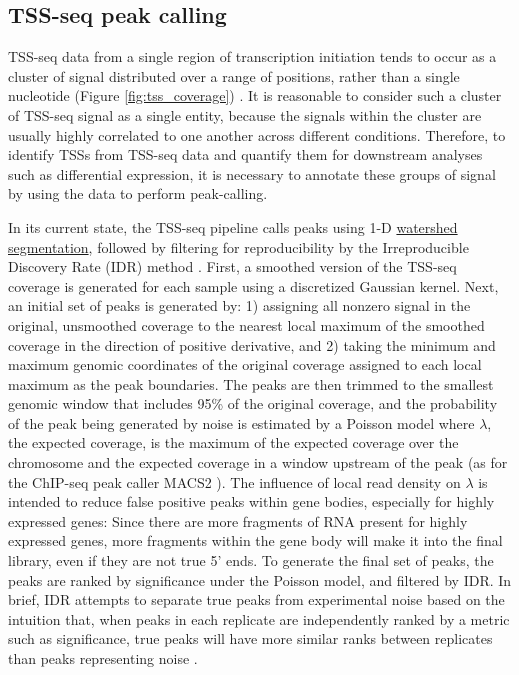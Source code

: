 \subsection{TSS-seq peak calling}

TSS-seq data from a single region of transcription initiation tends to occur as a cluster of signal distributed over a range of positions, rather than a single nucleotide (Figure \ref{fig:tss_coverage}) \citep{arribere2013, malabat2015}.
It is reasonable to consider such a cluster of TSS-seq signal as a single entity, because the signals within the cluster are usually highly correlated to one another across different conditions.
Therefore, to identify TSSs from TSS-seq data and quantify them for downstream analyses such as differential expression, it is necessary to annotate these groups of signal by using the data to perform peak-calling.

In its current state, the TSS-seq pipeline calls peaks using 1-D \href{https://en.wikipedia.org/wiki/Watershed_(image_processing)}{watershed segmentation}, followed by filtering for reproducibility by the Irreproducible Discovery Rate (IDR) method \citep{li2011}.
First, a smoothed version of the TSS-seq coverage is generated for each sample using a discretized Gaussian kernel.
Next, an initial set of peaks is generated by: 1) assigning all nonzero signal in the original, unsmoothed coverage to the nearest local maximum of the smoothed coverage in the direction of positive derivative, and 2) taking the minimum and maximum genomic coordinates of the original coverage assigned to each local maximum as the peak boundaries.
The peaks are then trimmed to the smallest genomic window that includes 95\% of the original coverage, and the probability of the peak being generated by noise is estimated by a Poisson model where $\lambda$, the expected coverage, is the maximum of the expected coverage over the chromosome and the expected coverage in a window upstream of the peak (as for the ChIP-seq peak caller MACS2 \citep{zhang2008}).
The influence of local read density on $\lambda$ is intended to reduce false positive peaks within gene bodies, especially for highly expressed genes: Since there are more fragments of RNA present for highly expressed genes, more fragments within the gene body will make it into the final library, even if they are not true 5' ends.
To generate the final set of peaks, the peaks are ranked by significance under the Poisson model, and filtered by IDR.
In brief, IDR attempts to separate true peaks from experimental noise based on the intuition that, when peaks in each replicate are independently ranked by a metric such as significance, true peaks will have more similar ranks between replicates than peaks representing noise \citep{li2011}.

